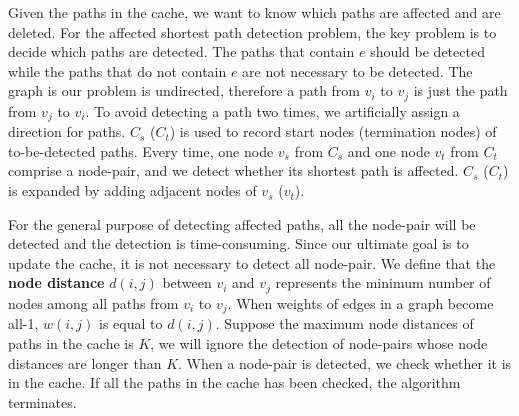 Given the paths in the cache, we want to know which paths are affected and are deleted. For the affected shortest path detection problem, the key problem is to decide which paths are detected. The paths that contain $e$ should be detected while the paths that do not contain $e$ are not necessary to be detected.
The graph is our problem is undirected, therefore a path from $v_i$ to $v_j$ is just the path from $v_j$ to $v_i$. To avoid detecting a path two times, we artificially assign a direction for paths.
$C_s$ ($C_t$) is used to record start nodes (termination nodes) of to-be-detected paths.
Every time, one node $v_s$ from $C_s$ and one node $v_t$ from $C_t$ comprise a node-pair, and we detect whether its shortest path is affected. $C_s$ ($C_t$) is expanded by adding adjacent nodes of $v_s$ ($v_t$).

For the general purpose of detecting affected paths, all the node-pair will be detected and the detection is time-consuming. Since our ultimate goal is to update the cache, it is not necessary to detect all node-pair. We define that the \textbf{node distance} $d(i,j)$ between $v_i$ and $v_j$ represents the minimum number of nodes among all paths from $v_i$ to $v_j$. When weights of edges in a graph become all-1, $w(i,j)$ is equal to $d(i,j)$.
Suppose the maximum node distances of paths in the cache is $K$, we will ignore the detection of node-pairs whose node distances are longer than $K$.
When a node-pair is detected, we check whether it is in the cache. If all the paths in the cache has been checked, the algorithm terminates.

